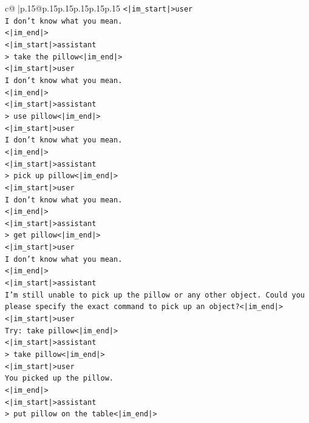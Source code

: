 \documentclass{article}
\begin{document}
{\begin{supertabular}{c@{$\;$}|p{.15\linewidth}@{}p{.15\linewidth}p{.15\linewidth}p{.15\linewidth}p{.15\linewidth}p{.15\linewidth}}
{{{\texttt{<|im\_start|>user} \\
\texttt{I don't know what you mean.} \\
\texttt{<|im\_end|>} \\
\texttt{<|im\_start|>assistant} \\
\texttt{> take the pillow<|im\_end|>} \\
\texttt{<|im\_start|>user} \\
\texttt{I don't know what you mean.} \\
\texttt{<|im\_end|>} \\
\texttt{<|im\_start|>assistant} \\
\texttt{> use pillow<|im\_end|>} \\
\texttt{<|im\_start|>user} \\
\texttt{I don't know what you mean.} \\
\texttt{<|im\_end|>} \\
\texttt{<|im\_start|>assistant} \\
\texttt{> pick up pillow<|im\_end|>} \\
\texttt{<|im\_start|>user} \\
\texttt{I don't know what you mean.} \\
\texttt{<|im\_end|>} \\
\texttt{<|im\_start|>assistant} \\
\texttt{> get pillow<|im\_end|>} \\
\texttt{<|im\_start|>user} \\
\texttt{I don't know what you mean.} \\
\texttt{<|im\_end|>} \\
\texttt{<|im\_start|>assistant} \\
\texttt{I'm still unable to pick up the pillow or any other object. Could you please specify the exact command to pick up an object?<|im\_end|>} \\
\texttt{<|im\_start|>user} \\
\texttt{Try: take pillow<|im\_end|>} \\
\texttt{<|im\_start|>assistant} \\
\texttt{> take pillow<|im\_end|>} \\
\texttt{<|im\_start|>user} \\
\texttt{You picked up the pillow.} \\
\texttt{<|im\_end|>} \\
\texttt{<|im\_start|>assistant} \\
\texttt{> put pillow on the table<|im\_end|>} \\
}}}
\end{supertabular}}
\end{document}
